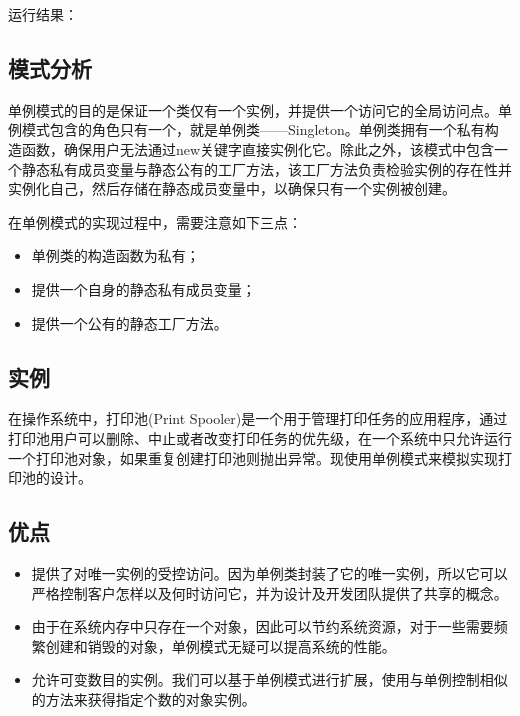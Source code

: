\documentclass[letterpaper,10pt,english]{sphinxmanual}
\begin{document}
\sphinxAtStartPar
运行结果：

\noindent{}


\subsection{模式分析}
\label{\detokenize{creational_patterns/singleton:id8}}
\sphinxAtStartPar
单例模式的目的是保证一个类仅有一个实例，并提供一个访问它的全局访问点。单例模式包含的角色只有一个，就是单例类——Singleton。单例类拥有一个私有构造函数，确保用户无法通过new关键字直接实例化它。除此之外，该模式中包含一个静态私有成员变量与静态公有的工厂方法，该工厂方法负责检验实例的存在性并实例化自己，然后存储在静态成员变量中，以确保只有一个实例被创建。

\sphinxAtStartPar
在单例模式的实现过程中，需要注意如下三点：
\begin{itemize}
\item {} 
\sphinxAtStartPar
单例类的构造函数为私有；

\item {} 
\sphinxAtStartPar
提供一个自身的静态私有成员变量；

\item {} 
\sphinxAtStartPar
提供一个公有的静态工厂方法。

\end{itemize}


\subsection{实例}
\label{\detokenize{creational_patterns/singleton:id9}}
\sphinxAtStartPar
在操作系统中，打印池(Print Spooler)是一个用于管理打印任务的应用程序，通过打印池用户可以删除、中止或者改变打印任务的优先级，在一个系统中只允许运行一个打印池对象，如果重复创建打印池则抛出异常。现使用单例模式来模拟实现打印池的设计。


\subsection{优点}
\label{\detokenize{creational_patterns/singleton:id10}}\begin{itemize}
\item {} 
\sphinxAtStartPar
提供了对唯一实例的受控访问。因为单例类封装了它的唯一实例，所以它可以严格控制客户怎样以及何时访问它，并为设计及开发团队提供了共享的概念。

\item {} 
\sphinxAtStartPar
由于在系统内存中只存在一个对象，因此可以节约系统资源，对于一些需要频繁创建和销毁的对象，单例模式无疑可以提高系统的性能。

\item {} 
\sphinxAtStartPar
允许可变数目的实例。我们可以基于单例模式进行扩展，使用与单例控制相似的方法来获得指定个数的对象实例。

\end{itemize}
\end{document}
